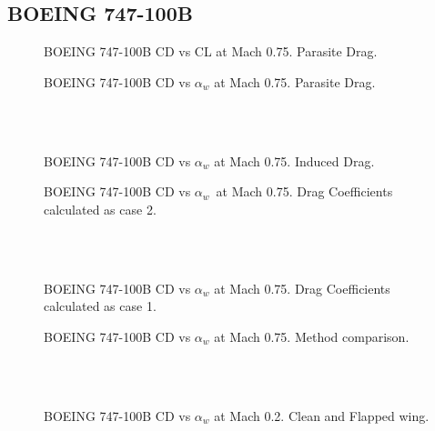\subsection{BOEING 747-100B}

\begin{figure}[H]
\centering

\caption{BOEING 747-100B CD vs CL at Mach 0.75. Parasite Drag.}
\label{fig:DragATR}
\end{figure}

\begin{figure}[H]
\centering

\caption{BOEING 747-100B CD vs $\alpha_w$ at Mach 0.75. Parasite Drag.}
\label{fig:DragATR}
\end{figure}
\noindent \\\\
\begin{figure}[H]
\centering

\caption{BOEING 747-100B CD vs $\alpha_w$ at Mach 0.75. Induced Drag.}
\label{fig:DragATR}
\end{figure}

\begin{figure}[H]
\centering

\caption{BOEING 747-100B CD vs $\alpha_w$\  at Mach 0.75. Drag Coefficients calculated as case 2.}
\label{fig:DragATR}
\end{figure}
\noindent \\\\
\begin{figure}[H]
\centering

\caption{BOEING 747-100B CD vs $\alpha_w$  at Mach 0.75. Drag Coefficients calculated as case 1.}
\label{fig:DragATR}
\end{figure}

\begin{figure}[H]
\centering

\caption{BOEING 747-100B CD vs $\alpha_w$  at Mach 0.75. Method comparison.}
\label{fig:DragATR}
\end{figure}
\noindent \\\\
\begin{figure}[H]
\centering

\caption{BOEING 747-100B CD vs $\alpha_w$  at Mach 0.2. Clean and Flapped wing.}
\label{fig:DragATR}
\end{figure}

%
%
%
%

